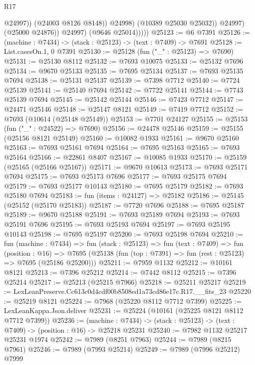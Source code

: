 \begin{lexlean}{R17}
\begin{coremodule}
                            @24997))
                        (@24003 @8126 @8148))
                      @24998)
                    (@10389 @25030 @25032))
                  @24997)
                (@25000 @24876))
              @24997)
            (@9646 @25014)))))
@25123 := @6 @7391
@25126 := (machine : @7434) -> (stack : @25123) -> (text : @7409) -> @7691
@25128 := List.casesOn.{1, 0} @7391
@25130 := @25128 (fun ("_" : @25123) => @7690)
@25131 := @25130 @8112
@25132 := @7693 @10075
@25133 := @25132 @7696
@25134 := @9670 @25133
@25135 := @7695 @25134
@25137 := @7693 @25135 @7694
@25138 := @25131 @25137
@25139 := @7398 @7712
@25140 := @7724 @25139
@25141 := @25140 @7694
@25142 := @7722 @25141
@25144 := @7743 @25139 @7694
@25145 := @25142 @25144
@25146 := @7423 @7712
@25147 := @24471 @25146
@25148 := @25147 @8121
@25149 := @7419 @7712
@25152 := @7693 (@10614 (@25148 @25149))
@25153 := @7701 @24127
@25155 := @25153 (fun ("_" : @24522) => @7690)
@25156 := @24478 @25146
@25159 := @25155 (@25156 @8121 @25149)
@25160 := @10082 @1933
@25161 := @9670 @25160
@25163 := @7693 @25161 @7694
@25164 := @7695 @25163
@25165 := @7693 @25164
@25166 := @22861 @8407
@25167 := @10085 @1933
@25170 := @25159 (@25165 (@25166 @25167))
@25171 := @9670 @10613
@25173 := @7693 @25171 @7694
@25175 := @7693 @25173 @7696
@25177 := @7693 @25175 @7694
@25179 := @7693 @25177 @10143
@25180 := @7695 @25179
@25182 := @7693 @25180 @7694
@25183 := fun (items : @24127) => @25182
@25186 := @25145 (@25152 (@25170 @25183))
@25187 := @7720 @7696
@25188 := @7695 @25187
@25189 := @9670 @25188
@25191 := @7693 @25189 @7694
@25193 := @7693 @25191 @7696
@25195 := @7693 @25193 @7694
@25197 := @7693 @25195 @10143
@25198 := @7695 @25197
@25200 := @7693 @25198 @7694
@25210 := fun (machine : @7434) =>
  fun (stack : @25123) =>
  fun (text : @7409) =>
  fun (position : @16) =>
  @7695 (@25138 (fun (top : @7391) => fun (rest : @25123) => @7695 (@25186 @25200)))
@25211 := @7959 @1132
@25212 := @10161 @8121
@25213 := @7396 @25212
@25214 := @7442 @8112
@25215 := @7396 @25214
@25217 := @25213 (@25215 @7966)
@25218 := @25211 @25217
@25219 := LexLeanPreserve.Cc613c0d4cdf00b8508ed1a73cd86e17c.R17.__fits_23
@25220 := @25219 @8121
@25224 := @7968 (@25220 @8112 @7712 @7399)
@25225 := LexLeanKappa.Json.deliver
@25231 := @25224 (@10161 (@25225 @8121 @8112 @7712 @7399))
@25236 := (machine : @7434) ->
  (stack : @25123) -> (text : @7409) -> (position : @16) -> @25218 @25231
@25240 := @7982 @1132 @25217 @25231 @1974
@25242 := @7989 (@8251 @7963)
@25244 := @7989 (@8215 @7961)
@25246 := @7989 (@7993 @25214)
@25249 := @7989 (@7996 @25212) @7999

\end{coremodule}
\end{lexlean}
